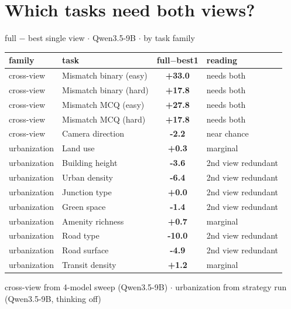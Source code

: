 \documentclass[aspectratio=169]{beamer}
\begin{document}
\section{Which tasks need both views?}
\begin{frame}{full $-$ best single view \textbf{$\cdot$} Qwen3.5-9B \textbf{$\cdot$} by task family}
\centering\scriptsize
\begin{tabular}{ll>{\bfseries}cl}
\toprule
family & task & full$-$best1 & reading \\
\midrule
cross-view & Mismatch binary (easy) & \textcolor{good}{+33.0} & \textcolor{good}{needs both} \\
cross-view & Mismatch binary (hard) & \textcolor{good}{+17.8} & \textcolor{good}{needs both} \\
cross-view & Mismatch MCQ (easy) & \textcolor{good}{+27.8} & \textcolor{good}{needs both} \\
cross-view & Mismatch MCQ (hard) & \textcolor{good}{+17.8} & \textcolor{good}{needs both} \\
cross-view & Camera direction & \textcolor{bad}{-2.2} & \textcolor{bad}{near chance} \\
\midrule
urbanization & Land use & +0.3 & marginal \\
urbanization & Building height & \textcolor{bad}{-3.6} & \textcolor{bad}{2nd view redundant} \\
urbanization & Urban density & \textcolor{bad}{-6.4} & \textcolor{bad}{2nd view redundant} \\
urbanization & Junction type & +0.0 & \textcolor{bad}{2nd view redundant} \\
urbanization & Green space & \textcolor{bad}{-1.4} & \textcolor{bad}{2nd view redundant} \\
urbanization & Amenity richness & +0.7 & marginal \\
urbanization & Road type & \textcolor{bad}{-10.0} & \textcolor{bad}{2nd view redundant} \\
urbanization & Road surface & \textcolor{bad}{-4.9} & \textcolor{bad}{2nd view redundant} \\
urbanization & Transit density & +1.2 & marginal \\
\bottomrule
\end{tabular}
\vspace{2pt}\par\tiny cross-view from 4-model sweep (Qwen3.5-9B) \textbf{$\cdot$} urbanization from strategy run (Qwen3.5-9B, thinking off)
\end{frame}
\end{document}
